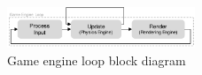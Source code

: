 \documentclass[letterpaper, 10 pt, journal, twoside]{IEEEtran}
\begin{document}
\begin{figure}[h]
\centering
\includegraphics[width=0.5\textwidth]{Other/Figures/GameEngineLoopv2.pdf}
\caption{Game engine loop block diagram~\cite{GameProgPatternsBook} }
\label{GameEngineLoopDiagram}
\end{figure}





% 


\end{document}
